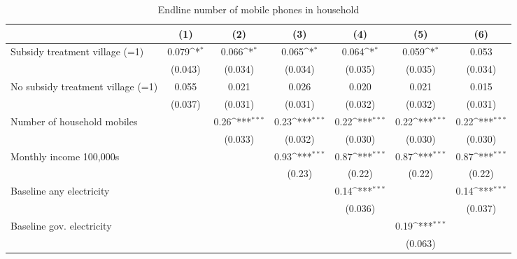\begin{table}[htbp]\centering
\def\sym#1{\ifmmode^{#1}\else\(^{#1}\)\fi}
\caption{Endline number of mobile phones in household}
\begin{tabular*}{1\hsize}{@{\hskip\tabcolsep\extracolsep\fill}l*{6}{c}}
\toprule
                &\multicolumn{1}{c}{(1)}         &\multicolumn{1}{c}{(2)}         &\multicolumn{1}{c}{(3)}         &\multicolumn{1}{c}{(4)}         &\multicolumn{1}{c}{(5)}         &\multicolumn{1}{c}{(6)}         \\
\midrule
Subsidy treatment village (=1)&    0.079\sym{*}  &    0.066\sym{*}  &    0.065\sym{*}  &    0.064\sym{*}  &    0.059\sym{*}  &    0.053         \\
                &  (0.043)         &  (0.034)         &  (0.034)         &  (0.035)         &  (0.035)         &  (0.034)         \\
No subsidy treatment village (=1)&    0.055         &    0.021         &    0.026         &    0.020         &    0.021         &    0.015         \\
                &  (0.037)         &  (0.031)         &  (0.031)         &  (0.032)         &  (0.032)         &  (0.031)         \\
Number of household mobiles&                  &     0.26\sym{***}&     0.23\sym{***}&     0.22\sym{***}&     0.22\sym{***}&     0.22\sym{***}\\
                &                  &  (0.033)         &  (0.032)         &  (0.030)         &  (0.030)         &  (0.030)         \\
Monthly income 100,000s&                  &                  &     0.93\sym{***}&     0.87\sym{***}&     0.87\sym{***}&     0.87\sym{***}\\
                &                  &                  &   (0.23)         &   (0.22)         &   (0.22)         &   (0.22)         \\
Baseline any electricity&                  &                  &                  &     0.14\sym{***}&                  &     0.14\sym{***}\\
                &                  &                  &                  &  (0.036)         &                  &  (0.037)         \\
Baseline gov. electricity&                  &                  &                  &                  &     0.19\sym{***}&                  \\
                &                  &                  &                  &                  &  (0.063)         &                  \\

\end{tabular*}
\end{table}
